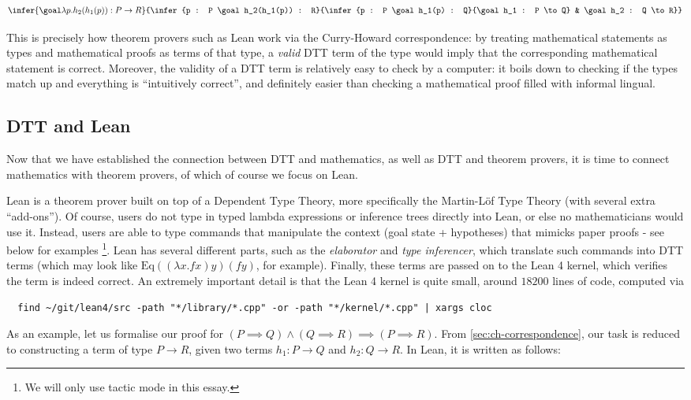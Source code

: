 \[
  \infer{\goal \lambda p. h_2(h_1(p)) : P \to R}{\infer{p : P \goal h_2(h_1(p)) : R}{\infer{p : P \goal h_1(p) : Q}{\goal h_1 : P \to Q} & \goal h_2 : Q \to R}}
\]

This is precisely how theorem provers such as Lean work via the Curry-Howard correspondence: by treating mathematical statements as types and mathematical proofs as terms of that type, a \textit{valid} DTT term of the type would imply that the corresponding mathematical statement is correct. Moreover, the validity of a DTT term is relatively easy to check by a computer: it boils down to checking if the types match up and everything is ``intuitively correct'', and definitely easier than checking a mathematical proof filled with informal lingual.

\subsection{DTT and Lean}

Now that we have established the connection between DTT and mathematics, as well as DTT and theorem provers, it is time to connect mathematics with theorem provers, of which of course we focus on Lean.

Lean is a theorem prover built on top of a Dependent Type Theory, more specifically the Martin-Löf Type Theory (with several extra ``add-ons''). Of course, users do not type in typed lambda expressions or inference trees directly into Lean, or else no mathematicians would use it. Instead, users are able to type commands that manipulate the context (goal state + hypotheses) that mimicks paper proofs - see below for examples \footnote{We will only use tactic mode in this essay.}. Lean has several different parts, such as the \textit{elaborator} and \textit{type inferencer}, which translate such commands into DTT terms (which may look like \(\mathrm{Eq} ((\lambda x. f x) y) (f y)\), for example). Finally, these terms are passed on to the Lean 4 kernel, which verifies the term is indeed correct. An extremely important detail is that the Lean 4 kernel is quite small, around \(18200\) lines of code, computed via

\begin{verbatim}
  find ~/git/lean4/src -path "*/library/*.cpp" -or -path "*/kernel/*.cpp" | xargs cloc
\end{verbatim}

As an example, let us formalise our proof for \((P \implies Q) \land (Q \implies R) \implies (P \implies R)\). From \ref{sec:ch-correspondence}, our task is reduced to constructing a term of type \(P \to R\), given two terms \(h_1 : P \to Q\) and \(h_2 : Q \to R\). In Lean, it is written as follows:

